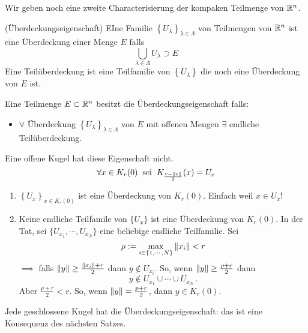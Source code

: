 Wir geben noch eine zweite Characterisierung der kompaken Teilmenge von $\mathbb{R}^n$.

\begin{Def}
  (Überdeckungseigenschaft)  EIne Familie $\left\{ U_\lambda \right\}_{\lambda\in\Lambda}$ von Teilmengen von $\mathbb{R}^n$ ist eine \"Uberdeckung einer Menge $E$ falls 
\[\bigcup_{\lambda\in\Lambda} U_\lambda\supset E\]
Eine Teilüberdeckung ist eine Teilfamilie von $\left\{ U_\lambda \right\}$ die noch eine Überdeckung von $E$ ist.

Eine Teilmenge $E\subset\mathbb{R}^n$ besitzt die Überdeckungseigenschaft falls:
 \begin{itemize}
    \item $\forall$ Überdeckung $\left\{ U_\lambda \right\}_{\lambda\in\Lambda}$ von $E$ mit offenen Mengen $\exists$ endliche Teilüberdeckung.
 \end{itemize}
 
\end{Def}
\begin{Bsp}\label{b:off}
  Eine offene Kugel hat diese Eigenschaft nicht.
  \[\forall x\in K_r(0)\hspace{2mm}\text{sei}\hspace{2mm} K_{\frac{r-\left\| x \right\|}{2}}(x)=U_x\]
  \begin{enumerate}
    \item $\left\{ U_x \right\}_{x\in K_r(0)}$ ist eine Überdeckung von $K_r(0)$.
    Einfach weil $x\in U_x$! 
\item Keine endliche Teilfamile von $\{U_x\}$ ist eine \"Uberdeckung von $K_r (0)$.
In der Tat, sei $\{U_{x_1},\cdots,U_{x_N}\}$ eine beliebige endliche Teilfamilie. Sei 
  \[\rho:=\max_{i\in\left\{ 1,\cdots,N \right\}}\left\| x_i \right\|<r\]
  $\implies$ falls $\left\| y \right\|\geq \frac{\left\| x_i \right\|+r}{2}$ dann $y\not\in U_{x_i}$. So, wenn $\left\| y \right\|\geq \frac{\rho+r}{2}$ dann
  \[y\not\in U_{x_1}\cup\cdots\cup U_{x_N}\, .\]
Aber $\frac{\rho+r}{2}< r$. So, wenn
 $\left\| y \right\|=\frac{p+r}{2}$, dann $y\in K_r(0)$.
\end{enumerate}
Jede geschlossene Kugel hat die \"Uberdeckungseigenschaft: das ist eine Konsequenz
des n\"achsten Satzes.
\end{Bsp}

